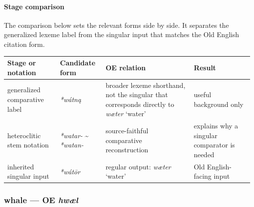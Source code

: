 \documentclass[
  british,
  a4paper,
]{article}
\newcounter{none} %
\begin{document}
\paragraph{Stage comparison}\label{stage-comparison-2}

The comparison below sets the relevant forms side by side. It separates
the generalized lexeme label from the singular input that matches the
Old English citation form.

{\def\LTcaptype{none} %
\begin{longtable}[]{@{}
  >{\raggedright\arraybackslash}p{}
  >{\raggedright\arraybackslash}p{}
  >{\raggedright\arraybackslash}p{}
  >{\raggedright\arraybackslash}p{}@{}}
\toprule\noalign{}
\begin{minipage}[b]{\linewidth}\raggedright
Stage or notation
\end{minipage} & \begin{minipage}[b]{\linewidth}\raggedright
Candidate form
\end{minipage} & \begin{minipage}[b]{\linewidth}\raggedright
OE relation
\end{minipage} & \begin{minipage}[b]{\linewidth}\raggedright
Result
\end{minipage} \\
\midrule\noalign{}
\endhead
\bottomrule\noalign{}
\endlastfoot
generalized comparative label & {\emph{*wátną}} & broader lexeme
shorthand, not the singular that corresponds directly to {\emph{wæter}}
`water' & useful background only \\
heteroclitic stem notation & \emph{*watar-} \textasciitilde{}
\emph{*watan-} & source-faithful comparative reconstruction & explains
why a singular comparator is needed \\
inherited singular input & {\emph{*wátōr}} & regular output:
{\emph{wæter}} `water' & Old English-facing input \\
\end{longtable}
}

\subsubsection{\texorpdfstring{whale --- OE
\emph{hwæl}}{whale --- OE hwæl}}\label{whale-oe-hwuxe6l}
\end{document}
